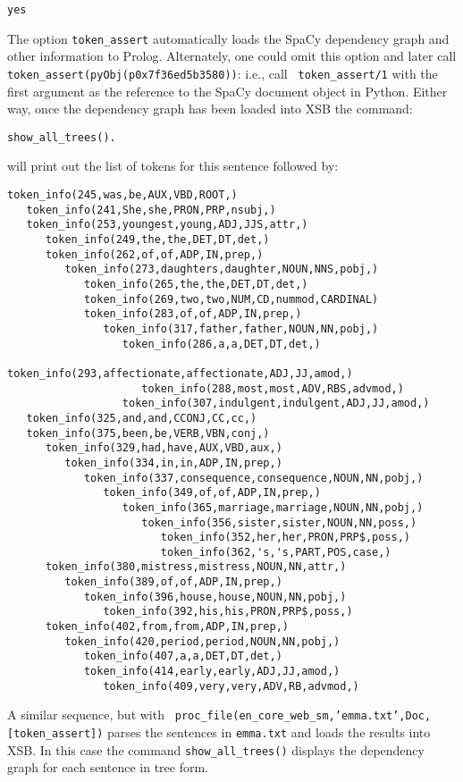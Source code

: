 \begin{example}
\begin{verbatim}
yes
\end{verbatim}
The option {\tt token\_assert} automatically loads the SpaCy
dependency graph and other information to Prolog.  Alternately, one
could omit this option and later call {\tt
  token\_assert(pyObj(p0x7f36ed5b3580))}: i.e., call {\tt
  token\_assert/1} with the first argument as the reference to the
SpaCy document object in Python.  Either way, once the dependency
graph has been loaded into XSB the command: 
\begin{verbatim}
show_all_trees().
\end{verbatim}
will print out the list of tokens for this sentence followed by:
    {\footnotesize
\begin{verbatim}
token_info(245,was,be,AUX,VBD,ROOT,)
   token_info(241,She,she,PRON,PRP,nsubj,)
   token_info(253,youngest,young,ADJ,JJS,attr,)
      token_info(249,the,the,DET,DT,det,)
      token_info(262,of,of,ADP,IN,prep,)
         token_info(273,daughters,daughter,NOUN,NNS,pobj,)
            token_info(265,the,the,DET,DT,det,)
            token_info(269,two,two,NUM,CD,nummod,CARDINAL)
            token_info(283,of,of,ADP,IN,prep,)
               token_info(317,father,father,NOUN,NN,pobj,)
                  token_info(286,a,a,DET,DT,det,)
                  token_info(293,affectionate,affectionate,ADJ,JJ,amod,)
                     token_info(288,most,most,ADV,RBS,advmod,)
                  token_info(307,indulgent,indulgent,ADJ,JJ,amod,)
   token_info(325,and,and,CCONJ,CC,cc,)
   token_info(375,been,be,VERB,VBN,conj,)
      token_info(329,had,have,AUX,VBD,aux,)
         token_info(334,in,in,ADP,IN,prep,)
            token_info(337,consequence,consequence,NOUN,NN,pobj,)
               token_info(349,of,of,ADP,IN,prep,)
                  token_info(365,marriage,marriage,NOUN,NN,pobj,)
                     token_info(356,sister,sister,NOUN,NN,poss,)
                        token_info(352,her,her,PRON,PRP$,poss,)
                        token_info(362,'s,'s,PART,POS,case,)
      token_info(380,mistress,mistress,NOUN,NN,attr,)
         token_info(389,of,of,ADP,IN,prep,)
            token_info(396,house,house,NOUN,NN,pobj,)
               token_info(392,his,his,PRON,PRP$,poss,)
      token_info(402,from,from,ADP,IN,prep,)
         token_info(420,period,period,NOUN,NN,pobj,)
            token_info(407,a,a,DET,DT,det,)
            token_info(414,early,early,ADJ,JJ,amod,)
               token_info(409,very,very,ADV,RB,advmod,)
\end{verbatim}
    }

A similar sequence, but with {\tt
  proc\_file(en\_core\_web\_sm,'emma.txt',Doc,[token\_assert])} parses
the sentences in {\tt emma.txt} and loads the results into XSB.  In
this case the command {\tt show\_all\_trees()} displays the dependency
graph for each sentence in tree form.
  \end{example}
 
